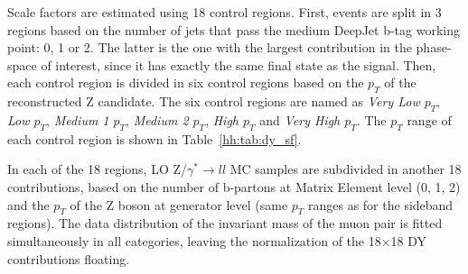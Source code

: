 \documentclass[../main.tex]{subfiles}
\begin{document}
Scale factors are estimated using 18 control regions. First, events are split in 3 regions based on the number of jets that pass the medium DeepJet b-tag working point: 0, 1 or 2. The latter is the one with the largest contribution in the phase-space of interest, since it has exactly the same final state as the signal. Then, each control region is divided in six control regions based on the $p_T$ of the reconstructed Z candidate. The six control regions are named as \textit{Very Low $p_T$}, \textit{Low $p_T$}, \textit{Medium 1 $p_T$}, \textit{Medium 2 $p_T$}, \textit{High $p_T$} and \textit{Very High $p_T$}. The $p_T$ range of each control region is shown in Table~\ref{hh:tab:dy_sf}.


In each of the 18 regions, LO Z/$\gamma^*\to ll$ MC samples are subdivided in another 18 contributions, based on the number of b-partons at Matrix Element level (0, 1, 2) and the $p_T$ of the Z boson at generator level (same $p_T$ ranges as for the sideband regions). The data distribution of the invariant mass of the muon pair is fitted simultaneously in all categories, leaving the normalization of the 18$\times$18 DY contributions floating. %


%
\end{document}
